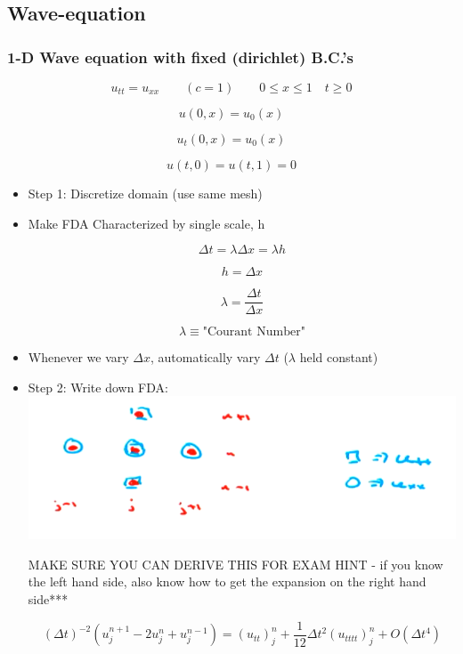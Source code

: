 \subsection{Wave-equation}

\subsubsection{1-D Wave equation with fixed (dirichlet) B.C.'s}

\[ u_{tt} = u_{xx} \qquad (c=1) \qquad 0 \le x \le 1 \quad t \ge 0\]

\[ u(0,x) = u_0(x)\]

\[ u_t(0,x) = u_0(x)\]

\[ u(t,0) = u(t,1) = 0\]

\begin{itemize}
    \item Step 1: Discretize domain (use same mesh)

    \item Make FDA Characterized by single scale, h

    \[ \Delta t = \lambda \Delta x = \lambda h\]

    \[ h = \Delta x\]

    \[ \lambda = \frac{\Delta t}{\Delta x}\]

    \[ \lambda \equiv \text{"Courant Number"}\]

    \item Whenever we vary $\Delta x$, automatically vary $\Delta t$ ($\lambda$ held constant)

    \item Step 2: Write down FDA:
    \includegraphics[width = \linewidth]{Images/wave_fda.png}


    MAKE SURE YOU CAN DERIVE THIS FOR EXAM HINT  - if you know the left hand side, also know how to get the expansion on the right hand side***

    
    \[ (\Delta t)^{-2} ( u_j^{n+1}-2u_j^n+u_j^{n-1}) = (u_{tt})_j^n + \frac{1}{12} \Delta t^2 (u_{tttt})_j^n + O(\Delta t^4)\]


\end{itemize}
